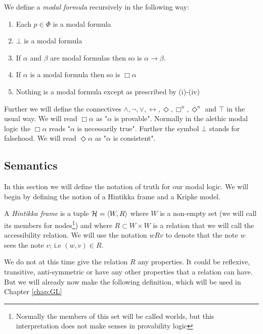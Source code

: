 \documentclass[../main.tex]{subfiles}
\begin{document}
\begin{defi}
	We define a \textit{modal formula} recursively in the following way:
	\begin{enumerate}[label=\roman*.]
		\item Each $p\in\Phi$ is a modal formula
		\item $\bot$ is a modal formula
		\item If $\alpha$ and $\beta$ are modal formulas then so is
			$\alpha\rightarrow\beta$.
		\item If $\alpha$ is a modal formula then so is $\Box\alpha$
		\item Nothing is a modal formula except as prescribed by
			(i)-(iv)
	\end{enumerate}
\end{defi}
Further we will define the connectives $\wedge,\neg,\vee,\leftrightarrow,
\Diamond, \Box^n,\Diamond^n$ and $\top$
in the usual way. 
We will read $\Box\alpha$ as "$\alpha$ is provable". Normally in the alethic modal logic the
$\Box\alpha$ reads "$\alpha$ is necessarily true". Further the symbol $\bot$ stands
for falsehood. We will read $\Diamond \alpha$ as "$\alpha$ is consistent".
\subsection{Semantics}
In this section we will define the notation of truth for our modal logic. We
will begin by defining the notion of a Hintikka frame and a Kripke model.
\begin{defi}
	A \textit{Hintikka frame} is a tuple $\mathcal{H}=\langle W,R\rangle$ where $W$ is
	a non-empty set (we will call its members for nodes\footnote{Normally
		the members of this set will be called worlds, but this
	interpretation does not make senses in provability logic}) and where $R\subset
	W\times W$ is a relation that we will call the accessibility relation.
	We will use the notation $wRv$ to denote that the note $w$ sees the note
	$v$; i.e $(w,v)\in R$.
\end{defi}
We do not at this time give the relation $R$ any properties. It could be
reflexive, transitive, anti-symmetric or have any other properties that a
relation can have. But we will already now make the following definition, which
will be used in Chapter \ref{chap:GL}
\end{document}
